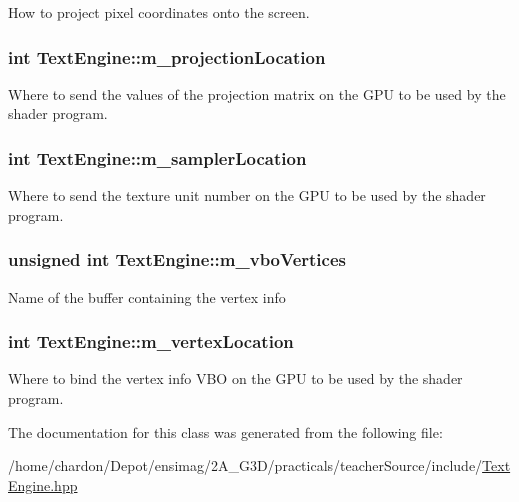 How to project pixel coordinates onto the screen. \hypertarget{classTextEngine_ade64d7603bb434bf411aec352e9d8e50}{
\subsubsection[{m\+\_\+projection\+Location}]{\setlength{\rightskip}{0pt plus 5cm}int Text\+Engine\+::m\+\_\+projection\+Location\hspace{0.3cm}{\ttfamily [private]}}}\label{classTextEngine_ade64d7603bb434bf411aec352e9d8e50}
Where to send the values of the projection matrix on the G\+P\+U to be used by the shader program. \hypertarget{classTextEngine_afa7486707c1a18c2bf83ffaa93564bff}{
\subsubsection[{m\+\_\+sampler\+Location}]{\setlength{\rightskip}{0pt plus 5cm}int Text\+Engine\+::m\+\_\+sampler\+Location\hspace{0.3cm}{\ttfamily [private]}}}\label{classTextEngine_afa7486707c1a18c2bf83ffaa93564bff}
Where to send the texture unit number on the G\+P\+U to be used by the shader program. \hypertarget{classTextEngine_ab64d559d7eb3fed8228c43c919c0cc42}{
\subsubsection[{m\+\_\+vbo\+Vertices}]{\setlength{\rightskip}{0pt plus 5cm}unsigned int Text\+Engine\+::m\+\_\+vbo\+Vertices\hspace{0.3cm}{\ttfamily [private]}}}\label{classTextEngine_ab64d559d7eb3fed8228c43c919c0cc42}
Name of the buffer containing the vertex info \hypertarget{classTextEngine_a5172679b8715801cf0c3247366238d57}{
\subsubsection[{m\+\_\+vertex\+Location}]{\setlength{\rightskip}{0pt plus 5cm}int Text\+Engine\+::m\+\_\+vertex\+Location\hspace{0.3cm}{\ttfamily [private]}}}\label{classTextEngine_a5172679b8715801cf0c3247366238d57}
Where to bind the vertex info V\+B\+O on the G\+P\+U to be used by the shader program. 

The documentation for this class was generated from the following file\+:\begin{DoxyCompactItemize}
\item 
/home/chardon/\+Depot/ensimag/2\+A\+\_\+\+G3\+D/practicals/teacher\+Source/include/\hyperlink{TextEngine_8hpp}{Text\+Engine.\+hpp}\end{DoxyCompactItemize}
